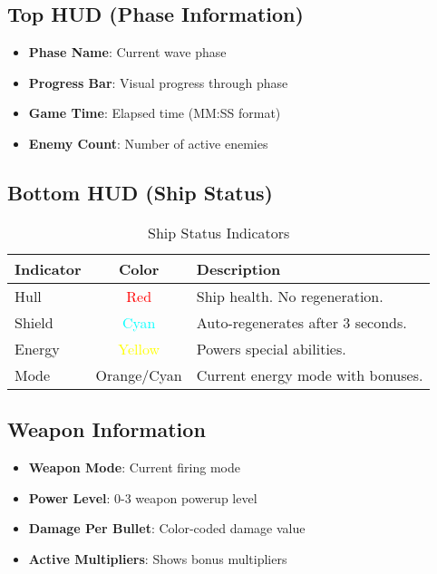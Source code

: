 \documentclass[11pt,a4paper]{article}
\begin{document}
\subsection{Top HUD (Phase Information)}
\begin{itemize}
    \item \textbf{Phase Name}: Current wave phase
    \item \textbf{Progress Bar}: Visual progress through phase
    \item \textbf{Game Time}: Elapsed time (MM:SS format)
    \item \textbf{Enemy Count}: Number of active enemies
\end{itemize}

\subsection{Bottom HUD (Ship Status)}

\begin{table}[h]
\centering
\begin{tabularx}{\textwidth}{|l|c|X|}
\hline
\rowcolor{primarycolor!20}
\textbf{Indicator} & \textbf{Color} & \textbf{Description} \\
\hline
Hull & \textcolor{red}{Red} & Ship health. No regeneration. \\
\hline
Shield & \textcolor{cyan}{Cyan} & Auto-regenerates after 3 seconds. \\
\hline
Energy & \textcolor{yellow}{Yellow} & Powers special abilities. \\
\hline
Mode & Orange/Cyan & Current energy mode with bonuses. \\
\hline
\end{tabularx}
\caption{Ship Status Indicators}
\end{table}

\subsection{Weapon Information}
\begin{itemize}
    \item \textbf{Weapon Mode}: Current firing mode
    \item \textbf{Power Level}: 0-3 weapon powerup level
    \item \textbf{Damage Per Bullet}: Color-coded damage value
    \item \textbf{Active Multipliers}: Shows bonus multipliers
\end{itemize}
\end{document}
